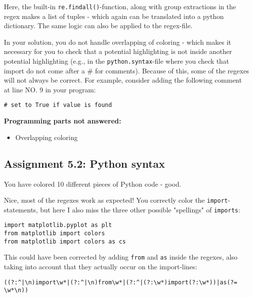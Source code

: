 \documentclass[a4paper]{article}
\begin{document}
Here, the built-in \texttt{re.findall()}-function, along with group extractions in the regex makes a list of tuples - which again can be translated into a python dictionary. The same logic can also be applied to the regex-file. 

In your solution, you do not handle overlapping of coloring - which makes it necessary for you to check that a potential highlighting is not inside another potential highlighting (e.g., in the \texttt{python.syntax}-file where you check that import do not come after a \# for comments). Because of this, some of the regexes will not always be correct. For example, consider adding the following comment at line NO. 9 in your program:

\begin{verbatim}
# set to True if value is found
\end{verbatim}

\textbf{Programming parts not answered:}
\begin{itemize}
  \item Overlapping coloring
\end{itemize}

\subsection*{Assignment 5.2: Python syntax} \label{sec:assignment5.2}
You have colored 10 different pieces of Python code - good.

Nice, most of the regexes work as expected! You correctly color the \texttt{import}-statements, but here I also miss the three other possible "spellings" of \texttt{imports}:

\begin{verbatim}
import matplotlib.pyplot as plt
from matplotlib import colors
from matplotlib import colors as cs
\end{verbatim}

This could have been corrected by adding \texttt{from} and \texttt{as} inside the regexes, also taking into account that they actually occur on the import-lines:

\begin{verbatim}
((?:^|\n)import\w*|(?:^|\n)from\w*|(?:^|(?:\w*)import(?:\w*))|as(?= \w*\n))
\end{verbatim}
\end{document}
